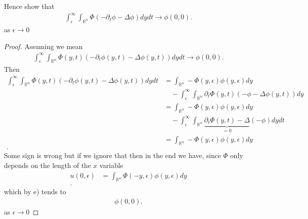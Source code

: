   \begin{exercise}[f]
   Hence show that 
   \begin{align*}
     \int_{\epsilon}^{\infty} \int_{\mathbb{R}^{n} }\Phi(-\partial_t \phi  - \Delta \phi )dydt \to \phi(0,0)
   .\end{align*}
   as $\epsilon \to 0$
  \end{exercise}
  \begin{proof}
   Assuming we mean 
   \begin{align*}
     \int_{\epsilon}^{\infty} \int_{\mathbb{R}^{n} }\Phi(y,t)(-\partial_t \phi(y,t)  - \Delta \phi(y,t) )dydt \to \phi(0,0)
   .\end{align*}
   Then 
   \begin{align*}
     \int_{\epsilon}^{\infty} \int_{\mathbb{R}^{n} }\Phi(y,t)(-\partial_t \phi(y,t)  - \Delta \phi(y,t) )dydt &= \int_{\mathbb{R}^{n} }-\Phi(y,\epsilon)\phi(y,\epsilon) dy  \\
                                                                                                              &  \quad -\int_{\epsilon}^{\infty}\int_{\mathbb{R}^{n} }  \partial_t \Phi(y,t) (-\phi - \Delta \phi(y,t) )dy\\
                                                                                                              &=\int_{\mathbb{R}^{n} }-\Phi(y,\epsilon)\phi(y,\epsilon) dy  \\
                                                                                                              & \quad  -\int_{\epsilon}^{\infty}\int_{\mathbb{R}^{n} }  \underbrace{\partial_t \Phi(y,t)-\Delta}_{=0} (-\phi)dy dt\\
                                                                                                              &= \int_{\mathbb{R}^{n} }-\Phi(y,\epsilon)\phi(y,\epsilon) dy  \\
   .\end{align*}
   Some sign is wrong but if we ignore that then in the end we have, since $\Phi $ only depends on the length of the $x$ variable
   \begin{align*}
     u(0,\epsilon) &= \int_{\mathbb{R}^{n} }\Phi(-y,\epsilon)\phi(y,\epsilon) dy  \\
   .\end{align*}
   which by e) tends to
   \begin{align*}
    \phi(0,0)
   .\end{align*}
   as $\epsilon\to 0$
  \end{proof}
